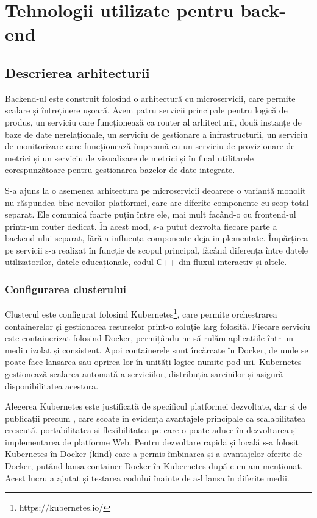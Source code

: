 \chapter{Tehnologii utilizate pentru back-end}
\label{sec:proj-backend}
\section{Descrierea arhitecturii}
\label{sec:proj-backend-architecture}

Backend-ul este construit folosind o arhitectură cu microservicii, care permite scalare și
întreținere ușoară. Avem patru servicii principale pentru logică de
produs, un serviciu care funcționează ca router al arhitecturii, două instanțe de baze de date
nerelaționale, un serviciu de gestionare a infrastructurii, un serviciu de monitorizare care
funcționează împreună cu un serviciu de provizionare de metrici și un serviciu de vizualizare de metrici
și în final utilitarele corespunzătoare pentru gestionarea bazelor de date integrate.

S-a ajuns la o asemenea arhitectura pe microservicii deoarece o variantă monolit nu răspundea
bine nevoilor platformei, care are diferite componente cu scop total separat. Ele
comunică foarte puțin între ele, mai mult facând-o cu  frontend-ul printr-un 
router dedicat. În acest mod, s-a putut dezvolta fiecare parte a backend-ului separat, fără
a influența componente deja implementate. Împărțirea pe servicii s-a realizat în funcție de scopul 
principal, făcând diferența între datele utilizatorilor, datele educaționale, codul C++ din fluxul interactiv și altele.

\subsection{Configurarea clusterului}
Clusterul este configurat folosind Kubernetes\footnote{https://kubernetes.io/}, care permite orchestrarea containerelor și
gestionarea resurselor print-o soluție larg folosită. Fiecare serviciu este containerizat folosind Docker,
permițându-ne să rulăm aplicațiile într-un mediu izolat și consistent. Apoi containerele sunt încărcate în Docker,
de unde se poate face lansarea sau oprirea lor în unități logice numite pod-uri. Kubernetes gestionează
scalarea automată a serviciilor, distribuția sarcinilor și asigură disponibilitatea acestora.

Alegerea Kubernetes este justificată de specificul platformei dezvoltate, dar și de publicații precum \cite{k8sBenefits}, care scoate în
evidența avantajele principale ca scalabilitatea crescută, portabilitatea și flexibilitatea pe care o poate
aduce în dezvoltarea și implementarea de platforme Web. Pentru dezvoltare rapidă și locală
s-a folosit Kubernetes în Docker (kind) care a permis îmbinarea și a avantajelor oferite de Docker, putând lansa 
container Docker în Kubernetes după cum am menționat. Acest lucru a ajutat și testarea
codului înainte de a-l lansa în diferite medii.

